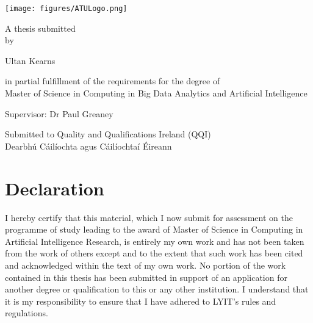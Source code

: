 \documentclass[a4paper,11pt]{report}
\begin{document}
\begin{titlepage}
    \begin{center}

    \vspace{30pt}
    \texttt{[image: figures/ATULogo.png]}\\
    \vspace{50pt}
    
    \fontsize{14}{20} \selectfont
    \vspace{20pt}
    
    A thesis submitted \\
    by\\
    \vspace{10pt}
    
    {\huge Ultan Kearns}\\
    \vspace{10pt}
    
     in partial fulfillment of the requirements for the degree of\\ Master of Science in Computing in Big Data Analytics and Artificial Intelligence
    \vspace{20pt}

    
    
    Supervisor: Dr Paul Greaney
    \vspace{30pt}
    
    
Submitted to Quality and Qualifications Ireland (QQI) \\
Dearbhú Cáilíochta agus Cáilíochtaí Éireann
    \centerline{\monthname \quad \the\year}
\end{center}    
\end{titlepage}

\onehalfspace


\setcounter{page}{1}

\setcounter{tocdepth}{2}

\tableofcontents
{}
\chapter*{Declaration}

I hereby certify that this material, which I now submit for assessment on the programme of study leading to the award of Master of Science in Computing in Artificial Intelligence Research, is entirely my own work and has not been taken from the work of others except and to the extent that such work has been cited and acknowledged within the text of my own work. No portion of the work contained in this thesis has been submitted in support of an application for another degree or qualification to this or any other institution. I understand that it is my responsibility to ensure that I have adhered to LYIT’s rules and regulations.
\bigskip
\end{document}
